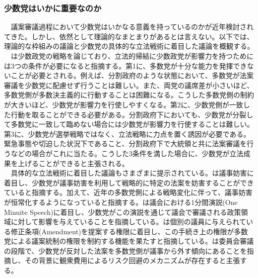 \documentclass{article}
\begin{document}
\subsubsection{少数党はいかに重要なのか}
　議案審議過程において少数党はいかなる意義を持っているのかが近年検討されてきた。しかし、依然として理論的なまとまりがあるとは言えない。以下では、理論的な枠組みの議論\citep*{Ballard2021-su}と少数党の具体的な立法戦術に着目した議論\citep*{Koger2010-uc}を概観する。
　\citet*{Ballard2021-su}は少数政党の戦略を論じており、立法的帰結に少数政党が影響力を持つためには3つの条件が必要になると指摘する。第1に、多数党が十分な能力を発揮できないことが必要とされる。例えば、分割政府のような状態において、多数党が法案審議を少数党に配慮せず行うことは難しい。また、両党の議席差が小さいほど、多数党側が多数決主義的に行動することは困難になる。こうした多数党側の制約が大きいほど、少数党が影響力を行使しやすくなる。第2に、少数党側が一致した行動を取ることができる必要がある。分割政府下においても、少数党が分裂して多数党に一致して臨めない場合には少数党が影響力を行使することは難しい。第3に、少数党が選挙戦略ではなく、立法戦略に力点を置く誘因が必要である。緊急事態や切迫した状況下であること、分割政府下で大統領と共に法案審議を行うなどの場合がこれに当たる。こうした3条件を満した場合に、少数党が立法成果を上げることができると主張される。\\
　具体的な立法戦術に着目した議論もさまざまに提示されている。\citet*{Koger2010-uc}は議事妨害に着目し、少数党が議事妨害を利用して戦略的に特定の法案を妨害することができていると指摘する。加えて、近年の多数党側による戦略変化に伴って、議事妨害が恒常化するようになっていると指摘する。\citet*{Hughes2018-dj}は議会における1分間演説(One Minuite Speech)に着目し、少数党がこの演説を通じて議会で審議される政策領域に対して影響を与えていることを指摘している。\citet*{Magleby2018-rc}は個別の議員に与えられている修正条項(Amendment)を提案する権限に着目し、この手続き上の権限が多数党による議案統制の権限を制約する機能を果たすと指摘している。\citet*{Bussing2021-pb}は委員会審議の段階で、少数党が反対した法案を多数党側が議事から外す傾向にあることを指摘し、その背景に観衆費用によるリスク回避のメカニズムが存在すると主張する。\\
\end{document}
